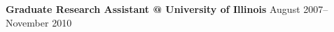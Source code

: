 \documentclass[11pt]{article}
\makeatletter
\newcommand{\jobitem}[4]{
    \vspace{2pt}

    \textbf{#1 @ #2} \hfill #3 %

    \vspace{-8pt}
}
\makeatother
\begin{document}



\vspace{-6pt}
\jobitem{Graduate Research Assistant}{University of Illinois}{August 2007--November 2010}{Urbana, IL}
\end{document}
